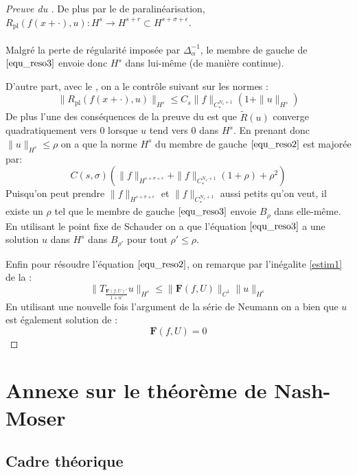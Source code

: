 \documentclass[11pt,a4paper]{article}
\begin{document}
\begin{proof}[Preuve du ]
De plus par le  de paralinéarisation, $R_{\text{pl}}(f(x+\cdot),u):  H^s \to H^{s+r} \subset H^{s+\sigma +\epsilon}$.
\\ 
\\
Malgré la perte de régularité imposée par  $\Delta_\alpha^{-1}$, le membre de gauche de $\eqref{equ_reso3}$ envoie donc $H^s$ dans lui-même (de manière continue).
\par
D'autre part, avec le , on a le contrôle suivant sur les normes :
\begin{equation*}
\|R_{\text{pl}}(f(x+\cdot),u)\|_{H^s} \leq C_s \|f\|_{C^{N_s+1}_*} (1+\|u\|_{H^s})
\end{equation*} 
De plus l'une des conséquences de la preuve du  est que $\tilde{R}(u)$ converge quadratiquement vers 0 lorsque $u$ tend vers 0 dans $H^s$. En prenant donc  $\|u\|_{H^s} \leq \rho $ on a que la norme $H^s$ du membre de gauche $\eqref{equ_reso2}$ est majorée par:
\begin{equation}
C(s,\sigma) ( \|f\|_{H^{s+\sigma+\epsilon}} +\|f\|_{C^{N_s+1}_*} (1+\rho) + \rho^2)
\end{equation} 
Puisqu'on peut prendre $\|f\|_{H^{s+\sigma+\epsilon}}$ et $\|f\|_{C^{N_s+1}_*}$ aussi petits qu'on veut, il existe un $\rho$ tel que le membre de gauche $\eqref{equ_reso3}$ envoie $B_\rho$ dans elle-même. En utilisant le point fixe de Schauder on a que l'équation $\eqref{equ_reso3}$ a une solution $u$ dans $H^s$ dans $B_{\rho'}$ pour tout $\rho' \leq \rho$. \\
\par
Enfin pour résoudre l'équation $\eqref{equ_reso2}$, on remarque par l'inégalite \eqref{estim1} de la  :
\begin{equation}
\|T_{\frac{\mathbf{F}(f,U)'}{1+u'}}u\|_{H^s} \leq \|\mathbf{F}(f,U)\|_{C^1}\|u\|_{H^s}
\end{equation}
En utilisant une nouvelle fois l'argument de la série de Neumann on a bien que $u$ est également solution de :
\begin{equation}
\mathbf{F}(f,U)=0
\end{equation}
\end{proof}

\newpage
\section{Annexe sur le théorème de Nash-Moser}
\subsection{Cadre théorique}
\end{document}
